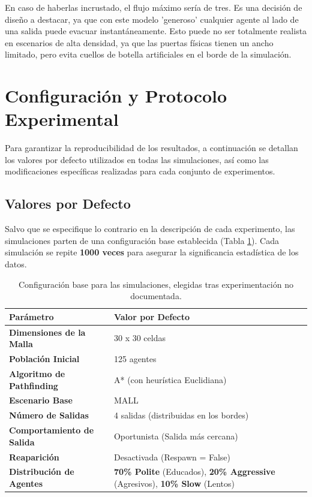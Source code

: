 \documentclass[11pt,spanish,listoffigures,listoftables]{tfgetsinf}
\begin{document}
En caso de haberlas incrustado, el flujo máximo sería de tres. Es una decisión de diseño a destacar, ya que con este modelo 'generoso' cualquier agente al lado de una salida puede evacuar instantáneamente. Esto puede no ser totalmente realista en escenarios de alta densidad, ya que las puertas físicas tienen un ancho limitado, pero evita cuellos de botella artificiales en el borde de la simulación.




\section{Configuración y Protocolo Experimental}
\label{sec:configuracion_experimental}

Para garantizar la reproducibilidad de los resultados, a continuación se detallan los valores por defecto utilizados en todas las simulaciones, así como las modificaciones específicas realizadas para cada conjunto de experimentos.

\subsection{Valores por Defecto}

Salvo que se especifique lo contrario en la descripción de cada experimento, las simulaciones parten de una configuración base establecida (Tabla \ref{tab:default_config}). Cada simulación se repite \textbf{1000 veces} para asegurar la significancia estadística de los datos.

\begin{table}[H]
\centering
\begin{tabularx}{\textwidth}{|l|X|}
\hline
\textbf{Parámetro} & \textbf{Valor por Defecto} \\
\hline
\textbf{Dimensiones de la Malla} & 30 x 30 celdas \\
\hline
\textbf{Población Inicial} & 125 agentes \\
\hline
\textbf{Algoritmo de Pathfinding} & A* (con heurística Euclidiana) \\
\hline
\textbf{Escenario Base} & MALL \\
\hline
\textbf{Número de Salidas} & 4 salidas (distribuidas en los bordes) \\
\hline
\textbf{Comportamiento de Salida} & Oportunista (Salida más cercana) \\
\hline
\textbf{Reaparición} & Desactivada (Respawn = False) \\
\hline
\textbf{Distribución de Agentes} & \textbf{70\% Polite} (Educados), \textbf{20\% Aggressive} (Agresivos), \textbf{10\% Slow} (Lentos) \\
\hline
\end{tabularx}
\caption{Configuración base para las simulaciones, elegidas tras experimentación no documentada.}
\label{tab:default_config}
\end{table}
\end{document}
